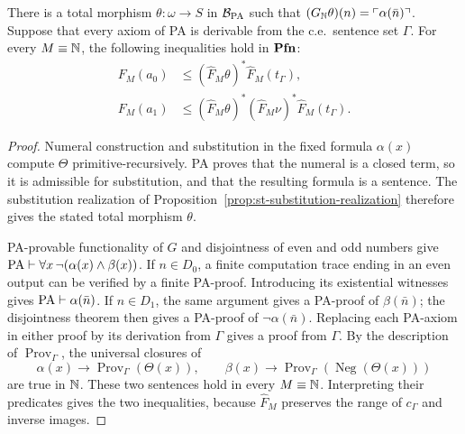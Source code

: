 \begin{lemma}
\label{lem:arithmetic-diagonal-representation}
There is a total morphism
$\theta:\omega\to S$ in $\mathcal B_{\mathrm{PA}}$ such that
$(G_{\mathbb N}\theta)(n)=\ulcorner\alpha(\bar n)\urcorner$.
Suppose that every axiom of PA is derivable from the c.e.\
sentence set $\Gamma$. For every $M\equiv\mathbb N$, the following
inequalities hold in $\mathbf{Pfn}$:
\begin{align*}
 F_M(a_0)&\le
   (\widehat F_M\theta)^*\widehat F_M(t_\Gamma),\\
 F_M(a_1)&\le
   (\widehat F_M\theta)^*(\widehat F_M\nu)^*
                   \widehat F_M(t_\Gamma).
\end{align*}
\end{lemma}
\begin{proof}
Numeral construction and substitution in the fixed formula
$\alpha(x)$ compute $\Theta$ primitive-recursively.
PA proves that the numeral is a closed term, so it is admissible
for substitution, and that the resulting formula is a sentence.
The substitution realization of
Proposition~\ref{prop:st-substitution-realization} therefore gives
the stated total morphism $\theta$.

PA-provable functionality of $G$ and disjointness of even and odd
numbers give $\mathrm{PA}\vdash\forall x\,\neg(\alpha(x)\land\beta(x))$.
If $n\in D_0$, a finite computation trace ending in an even
output can be verified by a finite PA-proof. Introducing its
existential witnesses gives $\mathrm{PA}\vdash\alpha(\bar n)$.
If $n\in D_1$, the same argument gives a PA-proof of
$\beta(\bar n)$; the disjointness theorem then gives
a PA-proof of $\neg\alpha(\bar n)$.
Replacing each PA-axiom in either proof by its derivation from
$\Gamma$ gives a proof from $\Gamma$.
By the description of $\operatorname{Prov}_\Gamma$, the
universal closures of
\[
 \alpha(x)\longrightarrow\operatorname{Prov}_\Gamma(\Theta(x)),
 \qquad
 \beta(x)\longrightarrow
       \operatorname{Prov}_\Gamma(\operatorname{Neg}(\Theta(x)))
\]
are true in $\mathbb N$.
These two sentences hold in every $M\equiv\mathbb N$.
Interpreting their predicates gives the two inequalities, because $\widehat F_M$ preserves the range of
$c_\Gamma$ and inverse images.
\end{proof}

